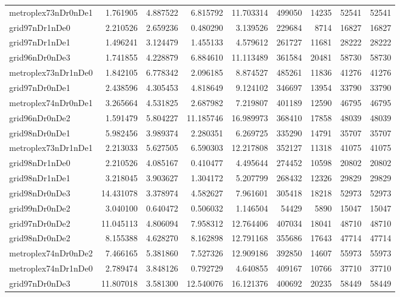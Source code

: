 \begin{longtable}{|l|r|r|r|r|r|r|r|r|}
metroplex73nDr0nDe1 & 1.761905 & 4.887522 & 6.815792 & 11.703314 & 499050 & 14235 & 52541 & 52541 \\
grid97nDr1nDe0 & 2.210526 & 2.659236 & 0.480290 & 3.139526 & 229684 & 8714 & 16827 & 16827 \\
grid97nDr1nDe1 & 1.496241 & 3.124479 & 1.455133 & 4.579612 & 261727 & 11681 & 28222 & 28222 \\
grid96nDr0nDe3 & 1.741855 & 4.228879 & 6.884610 & 11.113489 & 361584 & 20481 & 58730 & 58730 \\
metroplex73nDr1nDe0 & 1.842105 & 6.778342 & 2.096185 & 8.874527 & 485261 & 11836 & 41276 & 41276 \\
grid97nDr0nDe1 & 2.438596 & 4.305453 & 4.818649 & 9.124102 & 346697 & 13954 & 33790 & 33790 \\
metroplex74nDr0nDe1 & 3.265664 & 4.531825 & 2.687982 & 7.219807 & 401189 & 12590 & 46795 & 46795 \\
grid96nDr0nDe2 & 1.591479 & 5.804227 & 11.185746 & 16.989973 & 368410 & 17858 & 48039 & 48039 \\
grid98nDr0nDe1 & 5.982456 & 3.989374 & 2.280351 & 6.269725 & 335290 & 14791 & 35707 & 35707 \\
metroplex73nDr1nDe1 & 2.213033 & 5.627505 & 6.590303 & 12.217808 & 352127 & 11318 & 41075 & 41075 \\
grid98nDr1nDe0 & 2.210526 & 4.085167 & 0.410477 & 4.495644 & 274452 & 10598 & 20802 & 20802 \\
grid98nDr1nDe1 & 3.218045 & 3.903627 & 1.304172 & 5.207799 & 268432 & 12326 & 29829 & 29829 \\
grid98nDr0nDe3 & 14.431078 & 3.378974 & 4.582627 & 7.961601 & 305418 & 18218 & 52973 & 52973 \\
grid99nDr0nDe2 & 3.040100 & 0.640472 & 0.506032 & 1.146504 & 54429 & 5890 & 15047 & 15047 \\
grid97nDr0nDe2 & 11.045113 & 4.806094 & 7.958312 & 12.764406 & 407034 & 18041 & 48710 & 48710 \\
grid98nDr0nDe2 & 8.155388 & 4.628270 & 8.162898 & 12.791168 & 355686 & 17643 & 47714 & 47714 \\
metroplex74nDr0nDe2 & 7.466165 & 5.381860 & 7.527326 & 12.909186 & 392850 & 14607 & 55973 & 55973 \\
metroplex74nDr1nDe0 & 2.789474 & 3.848126 & 0.792729 & 4.640855 & 409167 & 10766 & 37710 & 37710 \\
grid97nDr0nDe3 & 11.807018 & 3.581300 & 12.540076 & 16.121376 & 400692 & 20235 & 58449 & 58449 \\

\end{longtable}
